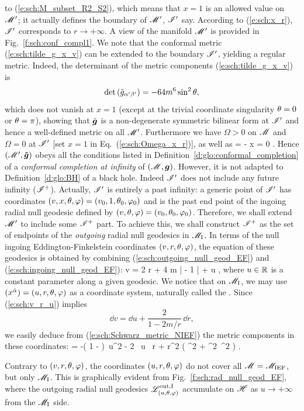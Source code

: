 to (\ref{e:sch:M_subset_R2_S2}), which means
that $x=1$ is an allowed value on $\mathscr{M}'$; it actually defines the boundary of
$\mathscr{M}'$, $\mathscr{I}'$ say.
According to (\ref{e:sch:x_r}),
$\mathscr{I}'$ corresponds to $r\rightarrow +\infty$.
A view of the manifold $\mathscr{M}'$ is
provided in Fig.~\ref{f:sch:conf_compl1}.
We note that the conformal metric (\ref{e:sch:tilde_g_x_v}) can be extended
to the boundary $\mathscr{I}'$, yielding a regular metric. Indeed, the determinant of
the metric components (\ref{e:sch:tilde_g_x_v}) is
\[
    \det\left({\tilde{g}}_{\alpha'\beta'}\right) = - 64 m^6 \sin^2\theta ,
\]
which does not vanish at $x=1$ (except at the trivial coordinate singularity
$\theta=0$ or $\theta=\pi$), showing that $\tilde{\bm{g}}$ is a non-degenerate
symmetric bilinear form at $\mathscr{I}'$ and hence a well-defined metric on all
$\mathscr{M}'$.
Furthermore
we have $\Omega >0$ on $\mathscr{M}$ and $\Omega=0$ at $\mathscr{I}'$ [set $x=1$ in Eq.~(\ref{e:sch:Omega_x_r})], as well as
\be
    \dd \Omega = - \dd x \not = 0 .
\ee
Hence $(\mathscr{M}',\bm{\tilde{g}})$ obeys all the conditions
listed in Definition~\ref{d:glo:conformal_completion} of a \emph{conformal completion at infinity}
of $(\mathscr{M},\bm{g})$.
However, it is not adapted to Definition~\ref{d:glo:BH} of a black hole. Indeed
$\mathscr{I}'$ does not include any future infinity ($\mathscr{I}^+$). Actually, $\mathscr{I}'$ is
entirely a past infinity: a generic point of $\mathscr{I}'$ has coordinates
$(v,x,\theta,\varphi) = (v_0,1,\theta_0,\varphi_0)$ and is the past end point of the
ingoing radial null geodesic defined by
$(v,\theta,\varphi) = (v_0,\theta_0,\varphi_0)$.
Therefore, we shall extend $\mathscr{M}'$ to include some $\mathscr{I}^+$ part.
To achieve this, we shall construct $\mathscr{I}^+$ as the set of endpoints of the
\emph{outgoing} radial null geodesics in $\mathscr{M}_{\rm I}$. In terms of
the null ingoing Eddington-Finkelstein coordinates $(v,r,\theta,\varphi)$,
the equation of these geodesics is obtained by combining (\ref{e:sch:outgoing_null_geod_EF}) and (\ref{e:sch:ingoing_null_geod_EF}):
\be \label{e:sch:v_r_u}
    v = 2 r + 4 m \ln \left|  - 1 \right| + u ,
\ee
where $u\in\mathbb{R}$ is a constant parameter along a given geodesic.
We notice that on $\mathscr{M}_{\rm I}$, we may use $(x^{\check{\alpha}}) = (u,r,\theta,\varphi)$ as a coordinate
system, naturally called the . Since (\ref{e:sch:v_r_u}) implies
\[
    \dd v = \dd u + \frac{2}{1-2m/r}\, \dd r,
\]
we easily deduce from (\ref{e:sch:Schwarz_metric_NIEF}) the metric components
in these coordinates:
\be \label{e:sch:g_u_r}
     = -\left( 1 -  \right)\, \dd u^2
            - 2 \, \dd u \, \dd r
        + r^2 \left( \dd\th^2 + \sin^2\th\, \dd\ph^2 \right) .
\ee
\begin{remark}
Contrary to $(v,r,\theta,\varphi)$, the coordinates $(u,r,\theta,\varphi)$ do not cover
all $\mathscr{M} = \mathscr{M}_{\rm IEF}$, but only $\mathscr{M}_{\rm I}$. This is graphically
evident from
Fig.~\ref{f:sch:rad_null_geod_EF}, where the outgoing radial null geodesics
$\mathscr{L}^{\rm out,I}_{(u,\theta,\varphi)}$
accumulate on $\mathscr{H}$ as $u\rightarrow +\infty$
from the $\mathscr{M}_{\rm I}$ side.
\end{remark}

